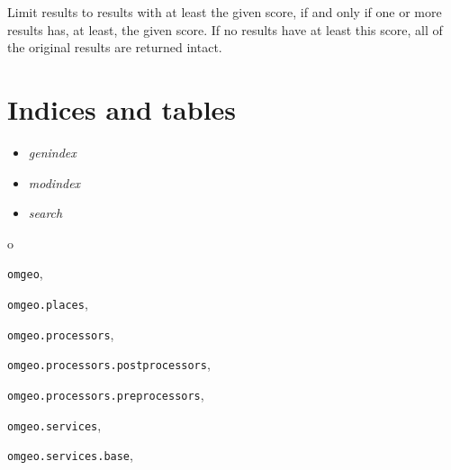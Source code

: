 \documentclass[letterpaper,10pt,english]{sphinxmanual}
\begin{document}

\begin{fulllineitems}
\label{index:omgeo.processors.postprocessors.UseHighScoreIfAtLeast}
Limit results to results with at least the given score,
if and only if one or more results has, at least, the
given score. If no results have at least this score,
all of the original results are returned intact.

\end{fulllineitems}



\chapter{Indices and tables}
\label{index:indices-and-tables}\begin{itemize}
\item {} 
\emph{genindex}

\item {} 
\emph{modindex}

\item {} 
\emph{search}

\end{itemize}


\renewcommand{\indexname}{Python Module Index}
\begin{theindex}
\def\bigletter#1{{\Large\sffamily#1}\nopagebreak\vspace{1mm}}
\bigletter{o}
\item {\texttt{omgeo}}, \pageref{index:module-omgeo}
\item {\texttt{omgeo.places}}, \pageref{index:module-omgeo.places}
\item {\texttt{omgeo.processors}}, \pageref{index:module-omgeo.processors}
\item {\texttt{omgeo.processors.postprocessors}}, \pageref{index:module-omgeo.processors.postprocessors}
\item {\texttt{omgeo.processors.preprocessors}}, \pageref{index:module-omgeo.processors.preprocessors}
\item {\texttt{omgeo.services}}, \pageref{index:module-omgeo.services}
\item {\texttt{omgeo.services.base}}, \pageref{index:module-omgeo.services.base}
\end{theindex}

\renewcommand{\indexname}{Index}
\printindex
\end{document}
